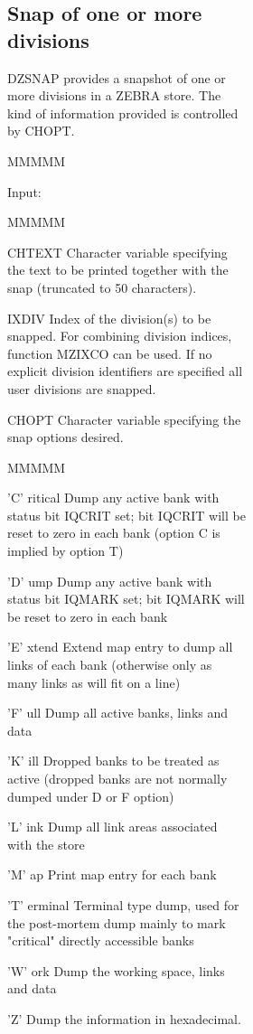 \begin{figure}
\begin{figure}
\begin{figure}
\subsection{Snap of one or more divisions}
\par DZSNAP provides a snapshot of one or more divisions in a ZEBRA store.
The kind of information provided is controlled by CHOPT.
\begin{DL}{MMMMM}
\item[Input:
]
\begin{DL}{MMMMM}
\item[CHTEXT
]Character variable specifying the text to be printed
together with the snap (truncated to 50 characters).
\item[IXDIV
]Index of the division(s) to be snapped.
\newline For combining division indices, function MZIXCO can be used.
\newline If no explicit division identifiers are specified
all user divisions are snapped.
\item[CHOPT
]Character variable specifying the snap options desired.
\begin{DL}{MMMMM}
\item['C' ritical
]Dump any active bank with status bit IQCRIT set;
bit IQCRIT will be reset to zero in each bank
(option C is implied by option T)
\item['D' ump
]Dump any active bank with status bit IQMARK set;
bit IQMARK will be reset to zero in each bank
\item['E' xtend
]Extend map entry to dump all links of each bank
(otherwise only as many links as will fit on a line)
\item['F' ull
]Dump all active banks, links and data
\item['K' ill
]Dropped banks to be treated as active
(dropped banks are not normally dumped under D or F option)
\item['L' ink
]Dump all link areas associated with the store
\item['M' ap
]Print map entry for each bank
\item['T' erminal
]Terminal type dump, used for the post-mortem dump
mainly to mark "critical" directly accessible banks
\item['W' ork
]Dump the working space, links and data
\item['Z'
]Dump the information in hexadecimal.
\end{DL}
\end{DL}
\end{DL}

\end{figure}
\end{figure}
\end{figure}

